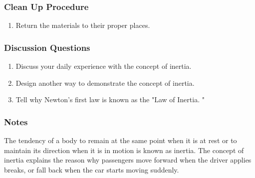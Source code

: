 \subsubsection*{Clean Up Procedure}
\begin{enumerate}
\item{Return the materials to their proper places.} 
\end{enumerate}

\subsubsection*{Discussion Questions}
\begin{enumerate}
\item{Discuss your daily experience with the concept of inertia.} 
\item{Design another way to demonstrate the concept of inertia.} 
\item{Tell why Newton's first law is known as the "Law of Inertia.  "}
\end{enumerate}

\subsubsection*{Notes}
The tendency of a body to remain at the same point when it is at rest or to maintain its direction when it is in motion is known as inertia. The concept of inertia explains the reason why passengers move forward when the driver applies breaks, or fall back when the car starts moving suddenly.
